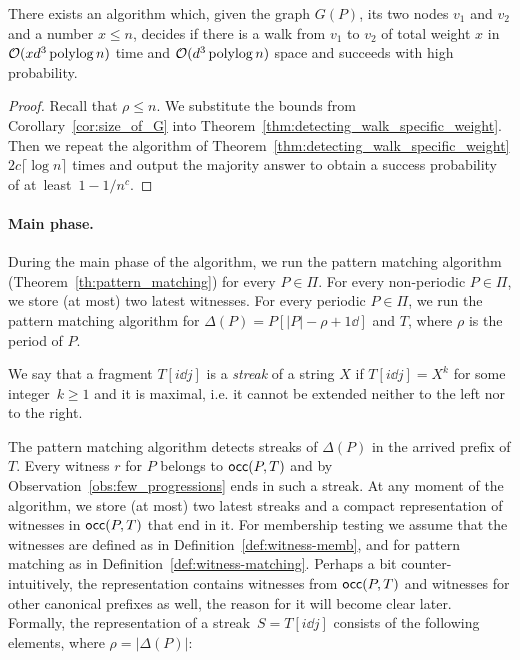 \begin{corollary}\label{cor:path_thompson}
There exists an algorithm which, given the graph $G(P)$, its two nodes $v_1$ and $v_2$ and a number $x\leq n$,  decides if there is a walk from $v_1$ to $v_2$ of total weight $x$ in $\mathcal{O}(xd^3\operatorname{polylog} n)$ time and $\mathcal{O}(d^3\operatorname{polylog} n)$ space and succeeds with high probability.
\end{corollary}
\begin{proof}
 Recall that $\rho \leq n$. 
 We substitute the bounds from Corollary~\ref{cor:size_of_G} into Theorem~\ref{thm:detecting_walk_specific_weight}.
 Then we repeat the algorithm of Theorem~\ref{thm:detecting_walk_specific_weight} $2c \lceil \log n \rceil$ times and output the majority answer to obtain a success probability of at~least~$1-1/n^c$.
\end{proof}


\paragraph{Main phase.}
During the main phase of the algorithm, we run the pattern matching algorithm (Theorem~\ref{th:pattern_matching}) for every $P \in \Pi$. For every non-periodic $P \in \Pi$, we store (at most) two latest witnesses. For every periodic $P \in \Pi$, we run the pattern matching algorithm for $\Delta(P) = P[|P|-\rho+1\dd]$ and $T$, where $\rho$ is the period of $P$. 

\begin{definition}
We say that a fragment $T[i \dd j]$ is a \emph{streak} of a string $X$ if $T[i \dd j] = X^k$ for some integer~$k \ge 1$ and it is maximal, i.e. it cannot be extended neither to the left nor to the right. 
\end{definition}

The pattern matching algorithm detects streaks of $\Delta(P)$ in the arrived prefix of $T$. Every witness $r$ for $P$ belongs to $\mathsf{occ}(P,T)$ and by Observation~\ref{obs:few_progressions} ends in such a streak.  At any moment of the algorithm, we store (at most) two latest streaks and a compact representation of witnesses in $\mathsf{occ}(P,T)$ that end in it. For membership testing we assume that the witnesses are defined as in Definition~\ref{def:witness-memb}, and for pattern matching as in Definition~\ref{def:witness-matching}. Perhaps a bit counter-intuitively, the representation contains witnesses from $\mathsf{occ}(P,T)$ and witnesses for other canonical prefixes as well, the reason for it will become clear later. Formally, the representation of a streak~$S = T[i \dd j]$ consists of the following elements, where $\rho = |\Delta(P)|$:

